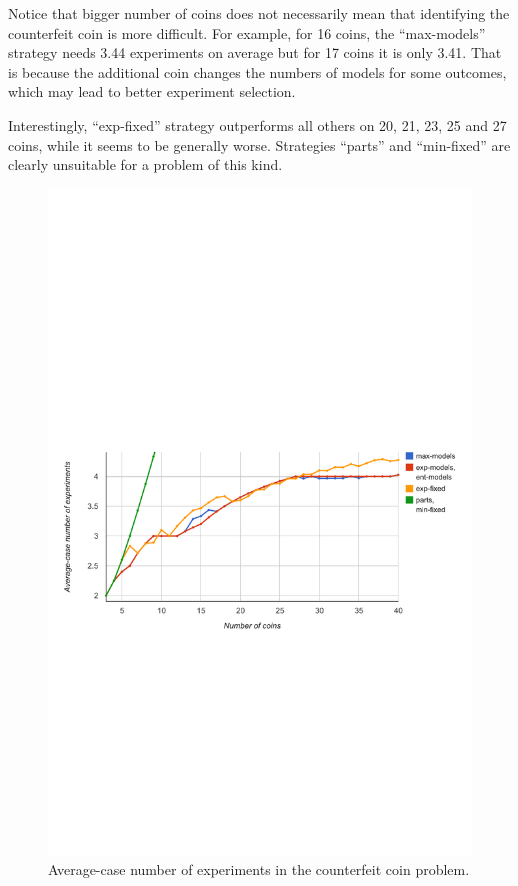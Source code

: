 Notice that bigger number of coins does not necessarily mean that
  identifying the counterfeit coin is more difficult.
For example, for 16 coins, the ``max-models'' strategy needs
  3.44 experiments on average but for 17 coins it is only 3.41.
That is because the additional coin changes
  the numbers of models for some outcomes,
  which may lead to better experiment selection.

Interestingly, ``exp-fixed'' strategy outperforms all others
  on 20, 21, 23, 25 and 27 coins, while it seems to be
  generally worse.
Strategies ``parts'' and ``min-fixed'' are clearly unsuitable for
  a problem of this kind.

\begin{figure}[h]
\begin{center}
\includegraphics[width=\textwidth]{pictures/graph-cc.pdf}
\caption{Average-case number of experiments in the counterfeit coin problem.}
\label{fig:exp-cc}
\end{center}
\end{figure}

